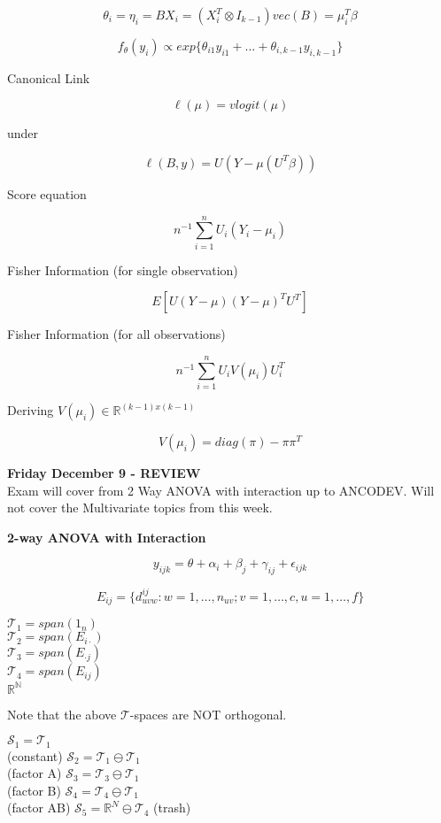 \documentclass[11pt,fleqn]{book} %
\begin{document}
		$$\theta_i = \eta_i = BX_i = (X_i^T \otimes I_{k-1})vec(B)= \mu_i^T\beta $$

		$$f_\theta(y_i) \propto exp\{\theta_{i1} y_{i1} + \dots + \theta_{i, k-1}y_{i, k-1}\}  $$

Canonical Link

		$$\ell(\mu) = vlogit(\mu) $$

under

		$$\ell(B, y) = U(Y- \mu(U^T\beta)) $$

Score equation

		$$n^{-1}\sum^n_{i=1} U_i (Y_i - \mu_i) $$

Fisher Information (for single observation)

		$$E[U(Y-\mu)(Y-\mu)^T U^T] $$

Fisher Information (for all observations)

		$$n^{-1} \sum^n_{i=1} U_i V(\mu_i) U_i^T $$

Deriving $V(\mu_i) \in \mathbb{R}^{(k-1)x(k-1)}$

		$$ V(\mu_i) = diag(\pi) - \pi \pi^T $$


\textbf{Friday December 9 - REVIEW}\\

Exam will cover from 2 Way ANOVA with interaction up to ANCODEV. Will not cover the Multivariate topics from this week. 

\textbf{2-way ANOVA with Interaction}

		$$y_{ijk}= \theta + \alpha_i + \beta_j + \gamma_{ij} + \epsilon_{ijk} $$

		$$E_{ij} = \{d^{ij}_{uvw}: w = 1, \dots, n_{uv}; v = 1, \dots, c, u = 1, \dots, f\} $$

$\mathcal{T}_1 =  span(1_n) $\\
$\mathcal{T}_2 = span(E_{i\cdot}) $ \\
$\mathcal{T}_3 = span(E_{\cdot j}) $ \\
$\mathcal{T}_4 = span(E_{ij}) $ \\ 
$\mathbb{R^N}$ 

Note that the above $\mathcal{T}$-spaces are NOT orthogonal. 

$\mathcal{S}_1 = \mathcal{T}_1$\\ (constant)
$\mathcal{S}_2 = \mathcal{T}_1 \ominus \mathcal{T}_1$\\ (factor A)
$\mathcal{S}_3 = \mathcal{T}_3 \ominus \mathcal{T}_1$\\ (factor B)
$\mathcal{S}_4 = \mathcal{T}_4 \ominus \mathcal{T}_1$\\ (factor AB)
$\mathcal{S}_5 = \mathbb{R}^N \ominus \mathcal{T}_4$ (trash)
\end{document}
